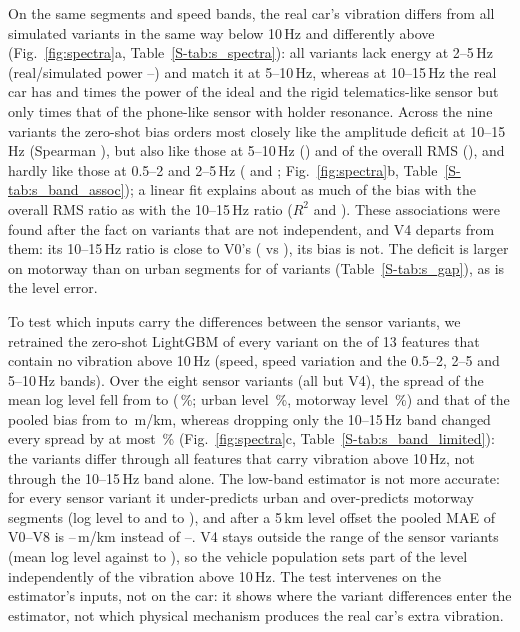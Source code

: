On the same segments and speed bands, the real car's vibration differs from all simulated variants in the same way below 10\,Hz and differently above (Fig.~\ref{fig:spectra}a, Table~\ref{S-tab:s_spectra}): all variants lack energy at 2--5\,Hz (real/simulated power \spVoneMidPow--\spVfiveMidPow) and match it at 5--10\,Hz, whereas at 10--15\,Hz the real car has \spVthreeHighPow{} and \spVoneHighPow{} times the power of the ideal and the rigid telematics-like sensor but only \spVtwoHighPow{} times that of the phone-like sensor with holder resonance.
Across the nine variants the zero-shot bias orders most closely like the amplitude deficit at 10--15\,Hz (Spearman \baSpHighBias), but also like those at 5--10\,Hz (\baSpMidHighBias) and of the overall RMS (\baSpRmsBias), and hardly like those at 0.5--2 and 2--5\,Hz (\baSpLowBias{} and \baSpMidBias; Fig.~\ref{fig:spectra}b, Table~\ref{S-tab:s_band_assoc}); a linear fit explains about as much of the bias with the overall RMS ratio as with the 10--15\,Hz ratio ($R^2$ \baRtwoRmsBias{} and \baRtwoHighBias).
These associations were found after the fact on variants that are not independent, and V4 departs from them: its 10--15\,Hz ratio is close to V0's (\vpVfourRatioHigh{} vs \vpVzeroRatioHigh), its bias is not.
The deficit is larger on motorway than on urban segments for \bgcMotorwayLarger{} of \bgcNvar{} variants (Table~\ref{S-tab:s_gap}), as is the level error.

To test which inputs carry the differences between the sensor variants, we retrained the zero-shot LightGBM of every variant on the \blNfeatLow{} of 13 features that contain no vibration above 10\,Hz (speed, speed variation and the 0.5--2, 2--5 and 5--10\,Hz bands).
Over the eight sensor variants (all but V4), the spread of the mean log level fell from \blFullSpreadLvl{} to \blLowSpreadLvl{} (\blRatioLvl\,\%; urban level \blRatioLvlUrban\,\%, motorway level \blRatioLvlMotorway\,\%) and that of the pooled bias from \blFullSpreadBias{} to \blLowSpreadBias\,m/km, whereas dropping only the 10--15\,Hz band changed every spread by at most \blNoHighMaxChange\,\% (Fig.~\ref{fig:spectra}c, Table~\ref{S-tab:s_band_limited}): the variants differ through all features that carry vibration above 10\,Hz, not through the 10--15\,Hz band alone.
The low-band estimator is not more accurate: for every sensor variant it under-predicts urban and over-predicts motorway segments (log level \blLowLvlUrbanMin{} to \blLowLvlUrbanMax{} and \blLowLvlMotorwayMin{} to \blLowLvlMotorwayMax), and after a 5\,km level offset the pooled MAE of V0--V8 is \blLowCalMin--\blLowCalMax\,m/km instead of \blFullCalMin--\blFullCalMax.
V4 stays outside the range of the sensor variants (mean log level \blLowVfourLvl{} against \blLowLvlMin{} to \blLowLvlMax), so the vehicle population sets part of the level independently of the vibration above 10\,Hz.
The test intervenes on the estimator's inputs, not on the car: it shows where the variant differences enter the estimator, not which physical mechanism produces the real car's extra vibration.

